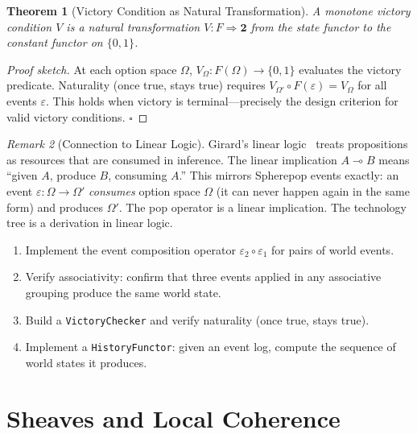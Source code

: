\documentclass[11pt,a4paper,openany]{book}
\theoremstyle{plain}
\newtheorem{theorem}{Theorem}[chapter]
\theoremstyle{definition}
\theoremstyle{remark}
\newtheorem{remark}[theorem]{Remark}
\newenvironment{project}[1]{%
  \begin{tcolorbox}[
    title={\textbf{Project: #1}},
    colback=projectbg,
    colframe=sphereblue,
    fonttitle=\bfseries\color{white},
    coltitle=white,
    attach boxed title to top left={yshift=-2mm, xshift=4mm},
    boxed title style={colback=sphereblue, sharp corners},
    sharp corners,
    breakable,
    before upper={\normalfont\setlength{\parindent}{0pt}\tolerance=9999\hbadness=9999}
  ]
}{\end{tcolorbox}}
\begin{document}
\begin{theorem}[Victory Condition as Natural Transformation]
  A monotone victory condition $V$ is a natural transformation
  $V : F \Rightarrow \mathbf{2}$ from the state functor to the constant
  functor on $\{0,1\}$.
\end{theorem}
\begin{proof}[Proof sketch]
  At each option space $\Omega$, $V_\Omega : F(\Omega) \to \{0,1\}$
  evaluates the victory predicate. Naturality (once true, stays true)
  requires $V_{\Omega'} \circ F(\varepsilon) = V_\Omega$ for all
  events $\varepsilon$. This holds when victory is terminal---precisely
  the design criterion for valid victory conditions. $\square$
\end{proof}

\begin{remark}[Connection to Linear Logic]
  Girard's linear logic~\cite{Girard} treats propositions as resources
  that are consumed in inference. The linear implication $A \multimap B$
  means ``given $A$, produce $B$, consuming $A$.'' This mirrors
  Spherepop events exactly: an event $\varepsilon : \Omega \to \Omega'$
  \emph{consumes} option space $\Omega$ (it can never happen again in
  the same form) and produces $\Omega'$. The pop operator is a linear
  implication. The technology tree is a derivation in linear logic.
\end{remark}

\begin{project}{Compositional World Transformations}
  \begin{enumerate}
    \item Implement the event composition operator
          $\varepsilon_2 \circ \varepsilon_1$ for pairs of world events.
    \item Verify associativity: confirm that three events applied in any
          associative grouping produce the same world state.
    \item Build a \texttt{VictoryChecker} and verify naturality
          (once true, stays true).
    \item Implement a \texttt{HistoryFunctor}: given an event log,
          compute the sequence of world states it produces.
  \end{enumerate}
\end{project}

\chapter{Sheaves and Local Coherence}
\label{ch:sheaves}
\end{document}
